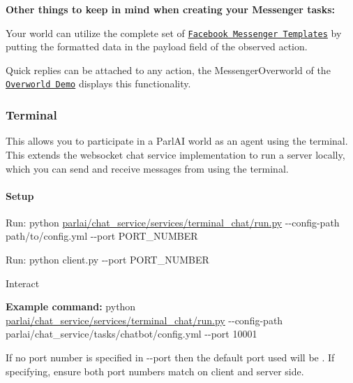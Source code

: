 {\bfseries Other things to keep in mind when creating your Messenger tasks\+:}
\begin{DoxyItemize}
\item Your world can utilize the complete set of \href{https://developers.facebook.com/docs/messenger-platform/send-messages/templates}{\tt Facebook Messenger Templates} by putting the formatted data in the \textquotesingle{}payload\textquotesingle{} field of the observed action.
\item Quick replies can be attached to any action, the {\ttfamily Messenger\+Overworld} of the \href{https://github.com/facebookresearch/ParlAI/blob/master/parlai/chat_service/tasks/overworld_demo/}{\tt Overworld Demo} displays this functionality.
\end{DoxyItemize}

\subsubsection*{Terminal}

This allows you to participate in a Parl\+AI world as an agent using the terminal. This extends the {\ttfamily websocket} chat service implementation to run a server locally, which you can send and receive messages from using the terminal.

\paragraph*{Setup}


\begin{DoxyEnumerate}
\item Run\+: {\ttfamily python \hyperlink{parlai_2chat__service_2services_2terminal__chat_2run_8py}{parlai/chat\+\_\+service/services/terminal\+\_\+chat/run.\+py} -\/-\/config-\/path path/to/config.\+yml -\/-\/port P\+O\+R\+T\+\_\+\+N\+U\+M\+B\+ER}
\item Run\+: {\ttfamily python client.\+py -\/-\/port P\+O\+R\+T\+\_\+\+N\+U\+M\+B\+ER}
\item Interact
\end{DoxyEnumerate}

{\bfseries Example command\+:} {\ttfamily python \hyperlink{parlai_2chat__service_2services_2terminal__chat_2run_8py}{parlai/chat\+\_\+service/services/terminal\+\_\+chat/run.\+py} -\/-\/config-\/path parlai/chat\+\_\+service/tasks/chatbot/config.\+yml -\/-\/port 10001}

If no port number is specified in {\ttfamily -\/-\/port} then the default port used will be {}. If specifying, ensure both port numbers match on client and server side.

